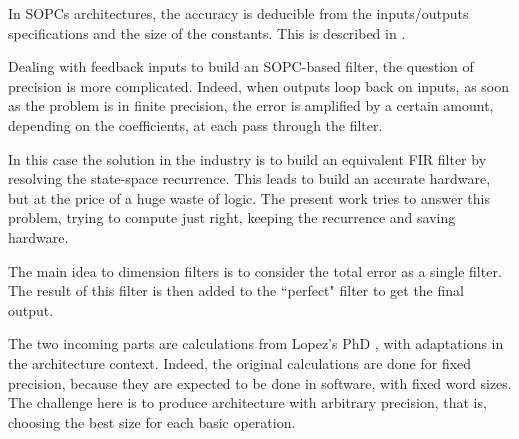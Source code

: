 	In SOPCs architectures, the accuracy is deducible from the inputs/outputs specifications and the size of the constants.
	This is described in \cite{sums}.

	Dealing with feedback inputs to build an SOPC-based filter, the question of precision is more complicated.
	Indeed, when outputs loop back on inputs, as soon as the problem is in finite precision, the error is amplified by a certain amount, depending on the coefficients, at each pass through the filter.

	In this case the solution in the industry is to build an equivalent FIR filter by resolving the state-space recurrence.
	This leads to build an accurate hardware, but at the price of a huge waste of logic.
	The present work tries to answer this problem, trying to compute just right, keeping the recurrence and saving hardware.

	The main idea to dimension filters is to consider the total error as a single filter.
	The result of this filter is then added to the ``perfect" filter to get the final output.

	The two incoming parts are calculations from Lopez's PhD \cite{lopez}, with adaptations in the architecture context.
	Indeed, the original calculations are done for fixed precision, because they are expected to be done in software, with fixed word sizes.
	The challenge here is to produce architecture with arbitrary precision, that is, choosing the best size for each basic operation.





